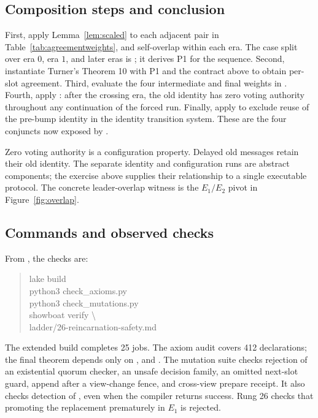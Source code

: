 \documentclass[10pt,journal,letterpaper]{IEEEtran}
\begin{document}
\subsection{Composition steps and conclusion}
First, apply Lemma~\ref{lem:scaled} to each adjacent pair in Table~\ref{tab:agreementweights}, and self-overlap within each era. The case split over era $0$, era $1$, and later eras is ; it derives P1 for the sequence. Second, instantiate Turner's Theorem 10 with P1 and the contract above to obtain per-slot agreement. Third, evaluate the four intermediate and final weights in . Fourth, apply : after the crossing era, the old identity has zero voting authority throughout any continuation of the forced run. Finally, apply  to exclude reuse of the pre-bump identity in the identity transition system. These are the four conjuncts now exposed by .

Zero voting authority is a configuration property. Delayed old messages retain their old identity. The separate identity and configuration runs are abstract components; the exercise above supplies their relationship to a single executable protocol. The concrete leader-overlap witness is the $E_1/E_2$ pivot in Figure~\ref{fig:overlap}.

\subsection{Commands and observed checks}
From , the checks are:
\begin{quote}\raggedright\ttfamily\small
lake build\\
python3 check\_axioms.py\\
python3 check\_mutations.py\\
showboat verify \textbackslash\\
ladder/26-reincarnation-safety.md
\end{quote}
The extended build completes 25 jobs. The axiom audit covers 412 declarations; the final theorem depends only on ,  and . The mutation suite checks rejection of an existential quorum checker, an unsafe decision family, an omitted next-slot guard, append after a view-change fence, and cross-view prepare receipt. It also checks detection of , even when the compiler returns success. Rung 26 checks that promoting the replacement prematurely in $E_1$ is rejected.
\end{document}
